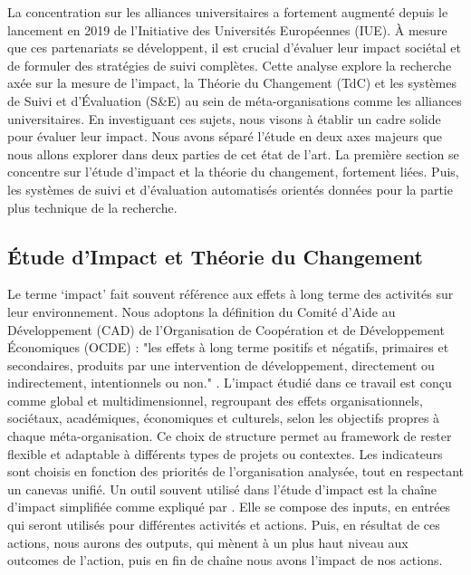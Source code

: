 La concentration sur les alliances universitaires a fortement augmenté depuis le lancement en 2019 de l'Initiative des Universités Européennes (IUE). À mesure que ces partenariats se développent, il est crucial d'évaluer leur impact sociétal et de formuler des stratégies de suivi complètes. Cette analyse explore la recherche axée sur la mesure de l'impact, la Théorie du Changement (TdC) et les systèmes de Suivi et d'Évaluation (S\&E) au sein de méta-organisations comme les alliances universitaires. En investiguant ces sujets, nous visons à établir un cadre solide pour évaluer leur impact.  Nous avons séparé l'étude en deux axes majeurs que nous allons explorer dans deux parties de cet état de l'art. La première section se concentre sur l'étude d'impact et la théorie du changement, fortement liées. Puis, les systèmes de suivi et d'évaluation automatisés orientés données pour la partie plus technique de la recherche.

\subsection{Étude d'Impact et Théorie du Changement}
Le terme ‘impact’ fait souvent référence aux effets à long terme des activités sur leur environnement. Nous adoptons la définition du Comité d'Aide au Développement (CAD) de l’Organisation de Coopération et de Développement Économiques (OCDE) : "les effets à long terme positifs et négatifs, primaires et secondaires, produits par une intervention de développement, directement ou indirectement, intentionnels ou non." \cite{oecd_quality_2010}.  
L'impact étudié dans ce travail est conçu comme global et multidimensionnel, regroupant des effets organisationnels, sociétaux, académiques, économiques et culturels, selon les objectifs propres à chaque méta-organisation. Ce choix de structure permet au framework de rester flexible et adaptable à différents types de projets ou contextes. Les indicateurs sont choisis en fonction des priorités de l’organisation analysée, tout en respectant un canevas unifié. Un outil souvent utilisé dans l'étude d'impact est la chaîne d'impact simplifiée comme expliqué par \cite{peersman_when_2016}. Elle se compose des inputs, en entrées qui seront utilisés pour différentes activités et actions. Puis, en résultat de ces actions, nous aurons des outputs, qui mènent à un plus haut niveau aux outcomes de l'action, puis en fin de chaîne nous avons l'impact de nos actions. 

